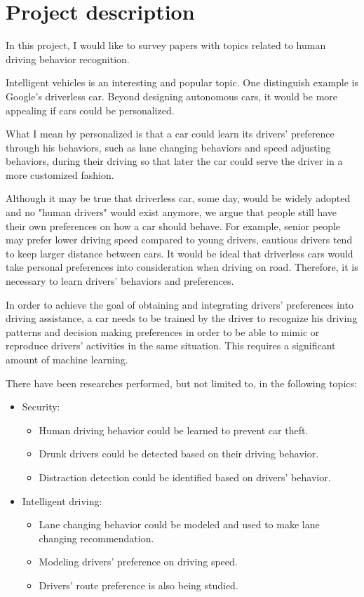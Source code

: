 \section{Project description}

In this project, I would like to survey papers with topics related to human driving behavior recognition.

Intelligent vehicles is an interesting and popular topic. One distinguish example is Google's driverless car. Beyond designing autonomous cars, it would be more appealing if cars could be personalized.

What I mean by personalized is that a car could learn its drivers' preference through his behaviors, such as lane changing behaviors and speed adjusting behaviors,  during their driving so that later the car could serve the driver in a more customized fashion.

Although it may be true that driverless car, some day, would be widely adopted and no "human drivers" would exist anymore, we argue that people still have their own preferences on how a car should behave. For example, senior people may prefer lower driving speed compared to young drivers, cautious drivers tend to keep larger distance between cars. It would be ideal that driverless cars would take personal preferences into consideration when driving on road. Therefore, it is necessary to learn drivers' behaviors and  preferences.

In order to achieve the goal of obtaining and integrating drivers' preferences into driving assistance, a car needs to be trained by the driver to recognize his driving patterns and decision making preferences in order to be able to mimic or reproduce drivers' activities in the same situation. This requires a significant amount of machine learning.

There have been researches performed, but not limited to, in the following topics:

\begin{itemize}
\item{Security:}
    \begin{itemize}
    \item Human driving behavior could be learned to prevent car theft.
    \item Drunk drivers could be detected based on their driving behavior.
    \item Distraction detection could be identified based on drivers' behavior.
    \end{itemize}
\item{Intelligent driving:}
    \begin{itemize}
    \item Lane changing behavior could be modeled and used to make lane changing recommendation.
    \item Modeling drivers' preference on driving speed.
    \item Drivers' route preference is also being studied.
    \end{itemize}
\end{itemize}

